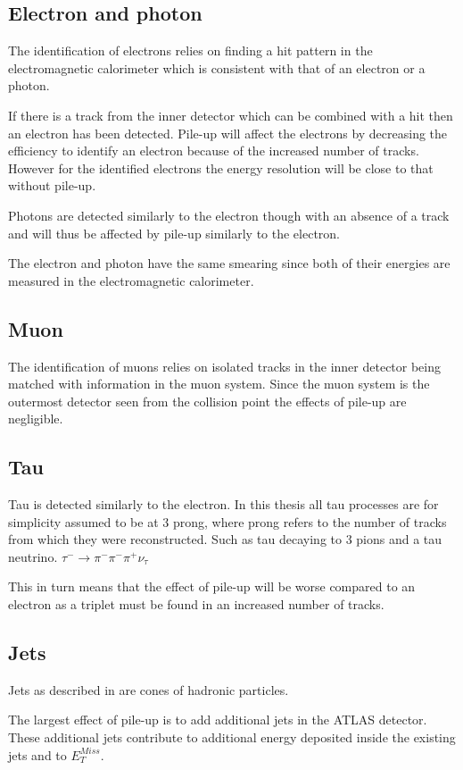 \subsection{Electron and photon}
The identification of electrons relies on finding a hit pattern in the electromagnetic calorimeter which is consistent with that of an electron or a photon. 

If there is a track from the inner detector which can be combined with a hit then an electron has been detected. Pile-up will affect the electrons by decreasing the efficiency to identify an electron because of the increased number of tracks. However for the identified electrons the energy resolution will be close to that without pile-up. 

Photons are detected similarly to the electron though with an absence of a track and will thus be affected by pile-up similarly to the electron.

The electron and photon have the same smearing since both of their energies are measured in the electromagnetic calorimeter. 

\subsection{Muon}
The identification of muons relies on isolated tracks in the inner detector  being matched with information in the muon system. Since the muon system is the outermost detector seen from the collision point the effects of pile-up are negligible.  
\subsection{Tau}\label{sec:smear:subsec:tau}
Tau is detected similarly to the electron.
In this thesis all tau processes are for simplicity assumed to be at 3 prong, where prong refers to the number of tracks from which they were reconstructed. Such as tau decaying to 3 pions and a tau neutrino. $\tau ^{-} \rightarrow \pi ^{-} \pi ^{-} \pi ^{+} \nu _{\tau}$

This in turn means that the effect of pile-up will be worse compared to an electron as a triplet must be found in an increased number of tracks.
\subsection{Jets}\label{sec:smear:subsec:jets}
Jets as described in  are cones of hadronic particles. 

The largest effect of pile-up is to add additional jets in the ATLAS detector. These additional jets contribute to additional energy deposited inside the existing jets and to $E^{Miss}_T$.
